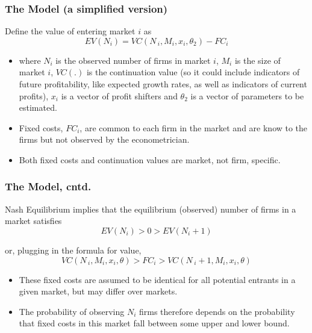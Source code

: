 \documentclass[notes=show]{beamer}
\begin{document}
\begin{frame}%

\frametitle{The Model (a simplified version)}

Define the value of entering market $i$ as 
\begin{equation}
EV(N_{i})=VC(N\,_{i},M_{i},x_{i},\theta _{2})-FC_{i}  \label{entry1}
\end{equation}

\begin{itemize}
\item where $N_{i}$ is the observed number of firms in market $i$, $M_{i}$
is the size of market $i$, $VC(.)$ is the continuation value (so it could
include indicators of future profitability, like expected growth rates, as
well as indicators of current profits), $x_{i}$ is a vector of profit
shifters and $\theta _{2}$ is a vector of parameters to be estimated.

\item Fixed costs, $FC_{i}$, are common to each firm in the market and are
know to the firms but not observed by the econometrician.

\item Both fixed costs and continuation values are market, not firm,
specific.
\end{itemize}

\end{frame}%

\begin{frame}%

\frametitle{The Model, cntd.}

Nash Equilibrium implies that the equilibrium (observed) number of firms in
a market satisfies 
\begin{equation}
EV(N_{i})>0>EV(N_{i}+1)  \label{entry2}
\end{equation}

or, plugging in the formula for value, 
\begin{equation}
VC(N\,_{i},M_{i},x_{i},\theta )>FC_{i}>VC(N\,_{i}+1,M_{i},x_{i},\theta )
\label{entry3}
\end{equation}

\begin{itemize}
\item These fixed costs are assumed to be identical for all potential
entrants in a given market, but may differ over markets.

\item The probability of observing $N_{i}$ firms therefore depends on the
probability that fixed costs in this market fall between some upper and
lower bound.
\end{itemize}

\end{frame}%
\end{document}
